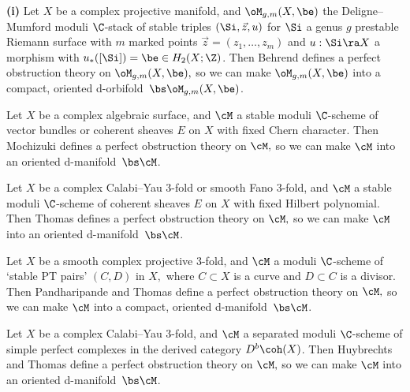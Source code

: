 \documentclass{article}
\begin{document}
\begin{thm}{\bf(i)}
 Let\/ $X$ be a complex projective manifold, and\/
$\oM_{g,m}(X,\be)$ the Deligne--Mumford moduli\/ $\C$-stack
of stable triples $(\Si,\vec z,u)$ for $\Si$ a genus $g$ prestable
Riemann surface with\/ $m$ marked points $\vec z=(z_1,\ldots,z_m)$
and\/ $u:\Si\ra X$ a morphism with\/ $u_*([\Si])=\be\in H_2(X;\Z)$.
Then Behrend\/ {\rm\cite{Behr}} defines a perfect obstruction
theory on
$\oM_{g,m}(X,\be),$ so we can make $\oM_{g,m}(X,\be)$ into a
compact, oriented d-orbifold\/~$\bs\oM_{g,m}(X,\be)$.
\smallskip

 Let\/ $X$ be a complex algebraic surface, and\/
$\cM$ a stable moduli\/ $\C$-scheme of vector bundles or coherent
sheaves $E$ on $X$ with fixed Chern character. Then Mochizuki
{\rm\cite{Moch}} defines a perfect obstruction theory on $\cM,$ so we can make $\cM$ into an
oriented d-manifold\/~$\bs\cM$.
\smallskip

 Let\/ $X$ be a complex Calabi--Yau
$3$-fold or smooth Fano $3$-fold, and\/ $\cM$ a stable moduli\/ $\C$-scheme of coherent
sheaves $E$ on $X$ with fixed Hilbert polynomial. Then Thomas\/ {\rm\cite{Thom}} defines
a perfect obstruction theory on $\cM,$ so we can make $\cM$ into an
oriented d-manifold\/~$\bs\cM$.
\smallskip

 Let\/ $X$ be a smooth complex projective
$3$-fold, and\/ $\cM$ a moduli\/ $\C$-scheme of `stable PT pairs'
$(C,D)$ in $X,$ where $C\subset X$ is a curve and $D\subset C$ is a
divisor. Then Pandharipande and Thomas\/ {\rm\cite{PaTh}} define a
perfect obstruction theory on $\cM,$ so we can make $\cM$ into a
compact, oriented d-manifold\/~$\bs\cM$.
\smallskip

 Let\/ $X$ be a complex Calabi--Yau
$3$-fold, and\/ $\cM$ a separated moduli\/
$\C$-scheme of simple perfect complexes in the derived
category $D^b\coh(X)$. Then Huybrechts and
Thomas\/ {\rm\cite{HuTh}} define a perfect obstruction theory on
$\cM,$ so we can make $\cM$ into an oriented
d-manifold\/~$\bs\cM$.
\label{ds16thm2}
\end{thm}
\end{document}

